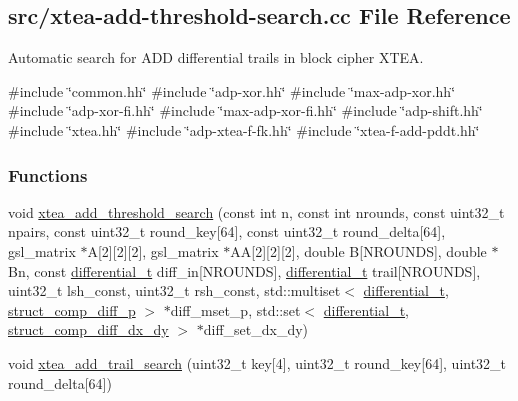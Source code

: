 \hypertarget{xtea-add-threshold-search_8cc}{\subsection{src/xtea-\/add-\/threshold-\/search.cc \-File \-Reference}
\label{xtea-add-threshold-search_8cc}
}


\-Automatic search for \-A\-D\-D differential trails in block cipher \-X\-T\-E\-A.  


{\ttfamily \#include \char`\"{}common.\-hh\char`\"{}}\*
{\ttfamily \#include \char`\"{}adp-\/xor.\-hh\char`\"{}}\*
{\ttfamily \#include \char`\"{}max-\/adp-\/xor.\-hh\char`\"{}}\*
{\ttfamily \#include \char`\"{}adp-\/xor-\/fi.\-hh\char`\"{}}\*
{\ttfamily \#include \char`\"{}max-\/adp-\/xor-\/fi.\-hh\char`\"{}}\*
{\ttfamily \#include \char`\"{}adp-\/shift.\-hh\char`\"{}}\*
{\ttfamily \#include \char`\"{}xtea.\-hh\char`\"{}}\*
{\ttfamily \#include \char`\"{}adp-\/xtea-\/f-\/fk.\-hh\char`\"{}}\*
{\ttfamily \#include \char`\"{}xtea-\/f-\/add-\/pddt.\-hh\char`\"{}}\*
\subsubsection*{\-Functions}
\begin{DoxyCompactItemize}
\item 
void \hyperlink{xtea-add-threshold-search_8cc_a18a7f48b1b44dcf0c408b2988cec4cf5}{xtea\-\_\-add\-\_\-threshold\-\_\-search} (const int n, const int nrounds, const uint32\-\_\-t npairs, const uint32\-\_\-t round\-\_\-key\mbox{[}64\mbox{]}, const uint32\-\_\-t round\-\_\-delta\mbox{[}64\mbox{]}, gsl\-\_\-matrix $\ast$\-A\mbox{[}2\mbox{]}\mbox{[}2\mbox{]}\mbox{[}2\mbox{]}, gsl\-\_\-matrix $\ast$\-A\-A\mbox{[}2\mbox{]}\mbox{[}2\mbox{]}\mbox{[}2\mbox{]}, double \-B\mbox{[}\-N\-R\-O\-U\-N\-D\-S\mbox{]}, double $\ast$\-Bn, const \hyperlink{structdifferential__t}{differential\-\_\-t} diff\-\_\-in\mbox{[}\-N\-R\-O\-U\-N\-D\-S\mbox{]}, \hyperlink{structdifferential__t}{differential\-\_\-t} trail\mbox{[}\-N\-R\-O\-U\-N\-D\-S\mbox{]}, uint32\-\_\-t lsh\-\_\-const, uint32\-\_\-t rsh\-\_\-const, std\-::multiset$<$ \hyperlink{structdifferential__t}{differential\-\_\-t}, \hyperlink{structstruct__comp__diff__p}{struct\-\_\-comp\-\_\-diff\-\_\-p} $>$ $\ast$diff\-\_\-mset\-\_\-p, std\-::set$<$ \hyperlink{structdifferential__t}{differential\-\_\-t}, \hyperlink{structstruct__comp__diff__dx__dy}{struct\-\_\-comp\-\_\-diff\-\_\-dx\-\_\-dy} $>$ $\ast$diff\-\_\-set\-\_\-dx\-\_\-dy)
\item 
void \hyperlink{xtea-add-threshold-search_8cc_a3fcd1eac7ae4338a32e79d7301c1fab0}{xtea\-\_\-add\-\_\-trail\-\_\-search} (uint32\-\_\-t key\mbox{[}4\mbox{]}, uint32\-\_\-t round\-\_\-key\mbox{[}64\mbox{]}, uint32\-\_\-t round\-\_\-delta\mbox{[}64\mbox{]})
\end{DoxyCompactItemize}


